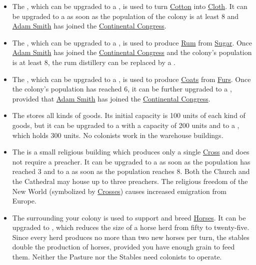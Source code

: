 \documentclass[12pt]{book}
\begin{document}
\begin{itemize}
\item The , which can be upgraded to a
  , is used to turn \hyperlink{Cotton}{Cotton}
  into \hyperlink{Cloth}{Cloth}. It can be upgraded to a
   as soon as the population of the colony is
  at least 8 and \hyperlink{Adam Smith}{Adam Smith} has joined the
  \hyperlink{Continental Congress}{Continental Congress}.

\item The , which can be upgraded to a
  , is used to produce \hyperlink{Rum}{Rum}
  from \hyperlink{Sugar}{Sugar}. Once \hyperlink{Adam Smith}{Adam
  Smith} has joined the \hyperlink{Continental Congress}{Continental
  Congress} and the colony's population is at least 8, the rum
  distillery can be replaced by a .

\item The , which can be upgraded to a
  , is used to produce
  \hyperlink{Coats}{Coats} from \hyperlink{Furs}{Furs}. Once the
  colony's population has reached 6, it can be further upgraded to a
  , provided that \hyperlink{Adam Smith}{Adam
  Smith} has joined the \hyperlink{Continental Congress}{Continental
  Congress}.

\item The  stores all kinds of goods. Its initial
  capacity is 100 units of each kind of goods, but it can be upgraded
  to a  with a capacity of 200 units and to a
  , which holds 300 units. No colonists
  work in the warehouse buildings.

\item The  is a small religious building which
  produces only a single \hyperlink{Crosses}{Cross} and does not
  require a preacher. It can be upgraded to a  as
  soon as the population has reached 3 and to a 
  as soon as the population reaches 8. Both the Church and the
  Cathedral may house up to three preachers. The religious freedom of
  the New World (symbolized by \hyperlink{Crosses}{Crosses}) causes
  increased emigration from Europe.

\item The  surrounding your colony is used to
  support and breed \hyperlink{Horses}{Horses}. It can be upgraded to
  , which reduces the size of a horse herd from
  fifty to twenty-five. Since every herd produces no more than two new
  horses per turn, the stables double the production of horses,
  provided you have enough grain to feed them. Neither the Pasture nor
  the Stables need colonists to operate.

\end{itemize}
\end{document}
